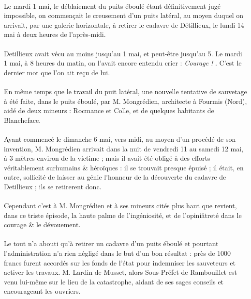 \documentclass[../eBook.tex]{subfiles}
\begin{document}
      \paragraph{}Le mardi 1 mai, le déblaiement du puits éboulé étant définitivement jugé impossible, on commençait le creusement d'un puits latéral, au moyen duquel on arrivait, par une galerie horizontale, à retirer le cadavre de Détillieux, le lundi 14 mai à deux heures de l'après-midi.
      \paragraph{}Detillieux avait vécu au moins jusqu'au 1 mai, et peut-être jusqu'au 5. Le mardi 1 mai, à 8 heures du matin, on l'avait encore entendu crier : \og \textit{Courage !} \fg{} . C'est le dernier mot que l'on ait reçu de lui.
      \paragraph{}En même temps que le travail du puit latéral, une nouvelle tentative de sauvetage à été faite, dans le puits éboulé, par M. Mongrédien, architecte à Fourmis (Nord), aidé de deux mineurs : Rocmance et Colle, et de quelques habitants de Blancheface.
      \paragraph{}Ayant commencé le dimanche 6 mai, vers midi, au moyen d'un procédé de son invention, M. Mongrédien arrivait dans la nuit de vendredi 11 au samedi 12 mai, à 3 mètres environ de la victime ; mais il avait été obligé à des efforts véritablement surhumains \& héroïques : il se trouvait presque épuisé ; il était, en outre, sollicité de laisser au génie l'honneur de la découverte du cadavre de Detillieux ; ils se retirerent donc.
      \paragraph{}Cependant c'est à M. Mongrédien et à ses mineurs cités plus haut que revient, dans ce triste épisode, la haute palme de l'ingéniosité, et de l'opiniâtreté dans le courage \& le dévouement.

      \vspace{12pt}
      \noindent\dotfill
      \paragraph{}Le tout n'a abouti qu'à retirer un cadavre d'un puits éboulé et pourtant l'administration n'a rien négligé dans le but d'un bon résultat : près de 1000 francs furent accordés sur les fonds de l'état pour indemniser les sauveteurs et activer les travaux. M. Lardin de Musset, alors Sous-Préfet de Rambouillet est venu lui-même sur le lieu de la catastrophe, aidant de ses sages conseils et encourageant les ouvriers.
\end{document}

